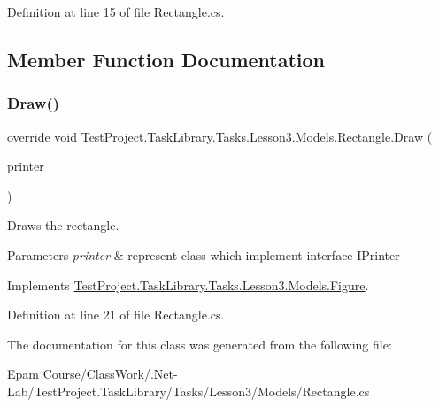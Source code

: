 Definition at line 15 of file Rectangle.\+cs.



\subsection{Member Function Documentation}
\mbox{\label{class_test_project_1_1_task_library_1_1_tasks_1_1_lesson3_1_1_models_1_1_rectangle_aba1c4aa1b28737fedd2bd3456bd6100e}} 
\subsubsection{\texorpdfstring{Draw()}{Draw()}}
{\footnotesize\ttfamily override void Test\+Project.\+Task\+Library.\+Tasks.\+Lesson3.\+Models.\+Rectangle.\+Draw (\begin{DoxyParamCaption}\item[{I\+Printer}]{printer }\end{DoxyParamCaption})\hspace{0.3cm}{\ttfamily [virtual]}}



Draws the rectangle. 


\begin{DoxyParams}{Parameters}
{\em printer} & represent class which implement interface I\+Printer\\
\hline
\end{DoxyParams}


Implements \mbox{\hyperlink{class_test_project_1_1_task_library_1_1_tasks_1_1_lesson3_1_1_models_1_1_figure_ab736419f3c4dbf51aa758b3d38c10e88}{Test\+Project.\+Task\+Library.\+Tasks.\+Lesson3.\+Models.\+Figure}}.



Definition at line 21 of file Rectangle.\+cs.



The documentation for this class was generated from the following file\+:\begin{DoxyCompactItemize}
\item 
Epam Course/\+Class\+Work/.\+Net-\/\+Lab/\+Test\+Project.\+Task\+Library/\+Tasks/\+Lesson3/\+Models/Rectangle.\+cs\end{DoxyCompactItemize}
